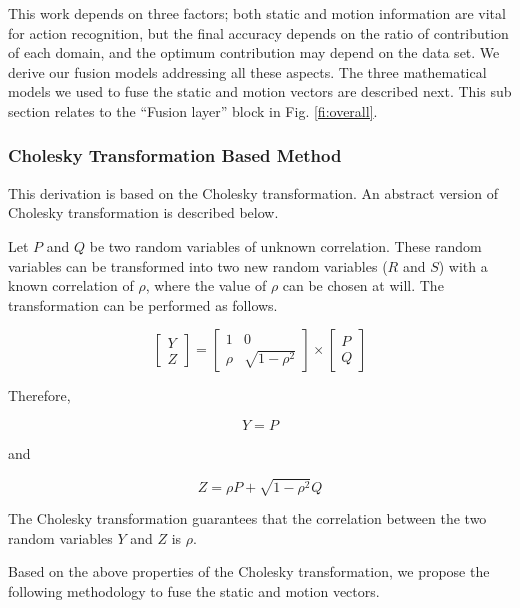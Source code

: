 
This work depends on three factors; both static and motion information
are vital for action recognition, but the final accuracy depends on the ratio of contribution of each domain,
and the optimum contribution may depend on the data set. We derive our fusion models addressing all these aspects.
The three mathematical models we used
to fuse the static and motion vectors are described next. This sub section relates to the ``Fusion layer'' block in Fig. \ref{fi:overall}.

\subsubsection{Cholesky Transformation Based Method}

This derivation is based on the Cholesky transformation. An
abstract version of Cholesky transformation is described below.

Let $P$ and $Q$ be two random variables of unknown correlation. These random variables can be
transformed into two new random variables ($R$ and $S$) with a known correlation of $\rho$, where the
value of $\rho$ can be chosen at will. The transformation can be performed as follows.

\begin{equation}
\begin{bmatrix}
    Y     \\
    Z
\end{bmatrix}
=
\begin{bmatrix}
    1  & 0 \\
    \rho  & \sqrt{1-\rho^2}
\end{bmatrix}
\times
\begin{bmatrix}
    P     \\
    Q
\end{bmatrix}
\end{equation}

Therefore,

\begin{equation}
Y = P
\end{equation}

and

\begin{equation}
Z = \rho P + \sqrt{1-\rho^2}Q
\end{equation}

The Cholesky transformation guarantees that the correlation between the two random variables
$Y$ and $Z$ is $\rho$.

Based on the above properties of the Cholesky transformation, we propose the following methodology to fuse the static and motion vectors.

